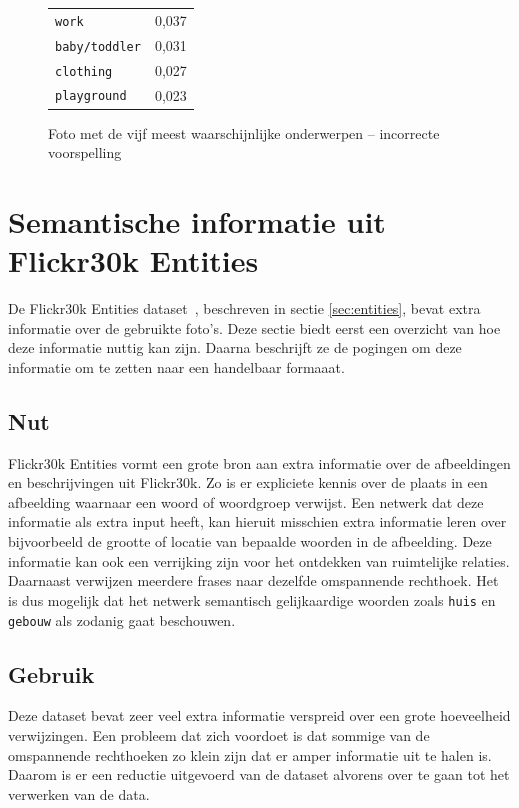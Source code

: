 \begin{figure}[h]
\begin{minipage}[t]{.5\textwidth}
\begin{tabular}{ll}
            \texttt{work}                   & 0,037 \\
            \texttt{baby/toddler}                 & 0,031 \\
            \texttt{clothing}           & 0,027 \\
            \texttt{playground}        & 0,023\\
            \hline
        \end{tabular}
    \end{minipage}
    \caption{Foto met de vijf meest waarschijnlijke onderwerpen -- incorrecte voorspelling}
    \label{fig:wrongldalearning}
\end{figure}


\section{Semantische informatie uit Flickr30k Entities}
De Flickr30k Entities dataset~\cite{Plummer2015}, beschreven in sectie \ref{sec:entities}, bevat extra informatie over de gebruikte foto's. Deze sectie biedt eerst een overzicht van hoe deze informatie nuttig kan zijn. Daarna beschrijft ze de pogingen om deze informatie om te zetten naar een handelbaar formaaat.

\subsection{Nut}
Flickr30k Entities vormt een grote bron aan extra informatie over de afbeeldingen en beschrijvingen uit Flickr30k. Zo is er expliciete kennis over de plaats in een afbeelding waarnaar een woord of woordgroep verwijst. Een netwerk dat deze informatie als extra input heeft, kan hieruit misschien extra informatie leren over bijvoorbeeld de grootte of locatie van bepaalde woorden in de afbeelding. Deze informatie kan ook een verrijking zijn voor het ontdekken van ruimtelijke relaties. Daarnaast verwijzen meerdere frases naar dezelfde omspannende rechthoek. Het is dus mogelijk dat het netwerk semantisch gelijkaardige woorden zoals \texttt{huis} en \texttt{gebouw} als zodanig gaat beschouwen.


\subsection{Gebruik}
\label{sub:Gebruik}
Deze dataset bevat zeer veel extra informatie verspreid over een grote hoeveelheid verwijzingen. Een probleem dat zich voordoet is dat sommige van de omspannende rechthoeken zo klein zijn dat er amper informatie uit te halen is. Daarom is er een reductie uitgevoerd van de dataset alvorens over te gaan tot het verwerken van de data. 

